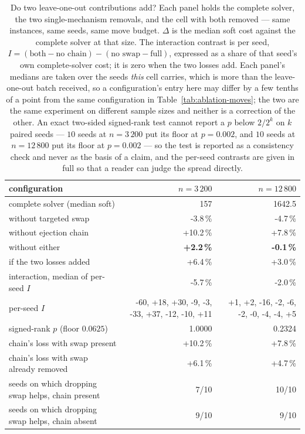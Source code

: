 \begin{table}[t]
\centering
\caption{Do two leave-one-out contributions add? Each panel holds the complete solver, the two single-mechanism removals, and the cell with both removed --- same instances, same seeds, same move budget. $\Delta$ is the median soft cost against the complete solver at that size. The interaction contrast is per seed, $I = (\textrm{both} - \textrm{no chain}) - (\textrm{no swap} - \textrm{full})$, expressed as a share of that seed's own complete-solver cost; it is zero when the two losses add. Each panel's medians are taken over the seeds \emph{this} cell carries, which is more than the leave-one-out batch received, so a configuration's entry here may differ by a few tenths of a point from the same configuration in Table~\ref{tab:ablation-moves}; the two are the same experiment on different sample sizes and neither is a correction of the other. An exact two-sided signed-rank test cannot report a $p$ below $2/2^{k}$ on $k$ paired seeds --- $10$ seeds at $n = 3\,200$ put its floor at $p = 0.002$, and $10$ seeds at $n = 12\,800$ put its floor at $p = 0.002$ --- so the test is reported as a consistency check and never as the basis of a claim, and the per-seed contrasts are given in full so that a reader can judge the spread directly.}
\label{tab:interaction}
\small
\begin{tabular}{@{}lrr@{}}
\toprule
configuration & $n = 3\,200$ & $n = 12\,800$ \\
\midrule
complete solver (median soft) & 157 & 1642.5 \\
without targeted swap & -3.8\,\% & -4.7\,\% \\
without ejection chain & +10.2\,\% & +7.8\,\% \\
without either & \textbf{+2.2\,\%} & \textbf{-0.1\,\%} \\
\addlinespace
if the two losses added & +6.4\,\% & +3.0\,\% \\
interaction, median of per-seed $I$ & -5.7\,\% & -2.0\,\% \\
per-seed $I$ & {\footnotesize -60, +18, +30, -9, -3, -33, +37, -12, -10, +11} & {\footnotesize +1, +2, -16, -2, -6, -2, -0, -4, -4, +5} \\
signed-rank $p$ (floor $0.0625$) & 1.0000 & 0.2324 \\
\addlinespace
chain's loss with swap present & +10.2\,\% & +7.8\,\% \\
chain's loss with swap already removed & +6.1\,\% & +4.7\,\% \\
\addlinespace
seeds on which dropping swap helps, chain present & 7/10 & 10/10 \\
seeds on which dropping swap helps, chain absent & 9/10 & 9/10 \\
\bottomrule
\end{tabular}
\end{table}
